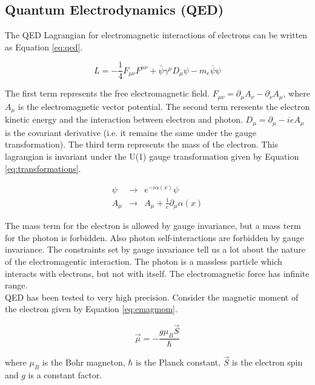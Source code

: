 \subsection{Quantum Electrodynamics (QED)}

The QED Lagrangian for electromagnetic interactions of electrons can be written 
as Equation \ref{eq:qed}.

\begin{equation}
L = -\frac{1}{4}F_{\mu\nu}F^{\mu\nu} + \bar{\psi}\gamma^{\mu}D_{\mu}\psi
- m_{e}\bar{\psi}\psi
\label{eq:qed}
\end{equation} 

The first term represents the free electromagnetic field. $F_{\mu\nu} = 
\partial_{\mu}A_{\nu} - \partial_{\nu}A_{\mu}$, where $A_{\mu}$ is the 
electromagnetic vector potential. The second term reresents the electron kinetic 
energy and the interaction between electron and photon. $D_{\mu} = 
\partial_{\mu} - ieA_{\mu}$ is the covariant derivative (i.e. it remains the 
same under the gauge transformation). The third term represents the mass of the 
electron. This lagrangian is invariant under the U(1) gauge transformation given 
by Equation \ref{eq:transformations}.

\begin{eqnarray}
\psi &\rightarrow& e^{-i\alpha(x)}\psi \\
A_{\mu}   &\rightarrow& A_{\mu} + \frac{1}{e}\partial_{\mu}\alpha(x)
\label{eq:transformations}
\end{eqnarray}

The mass term for the electron is allowed by gauge invariance, but a mass term for 
the photon is forbidden. Also photon self-interactions are forbidden by gauge 
invariance. The constraints set by gauge invariance tell us a lot about the
nature of the electromagentic interaction. The photon is a massless particle which 
interacts with electrons, but not with itself. The electromagnetic force has 
infinite range. \\

QED has been tested to very high precision. Consider the magnetic moment of the
electron given by Equation \ref{eq:emagmom}.

\begin{equation}
\vec{\mu} = -\frac{g\mu_{B}\vec{S}}{\hbar}
\label{eq:emagmom}
\end{equation}

where $\mu_B$ is the Bohr magneton, $\hbar$ is the Planck constant, $\vec{S}$ is
the electron spin and $g$ is a constant factor. \\

